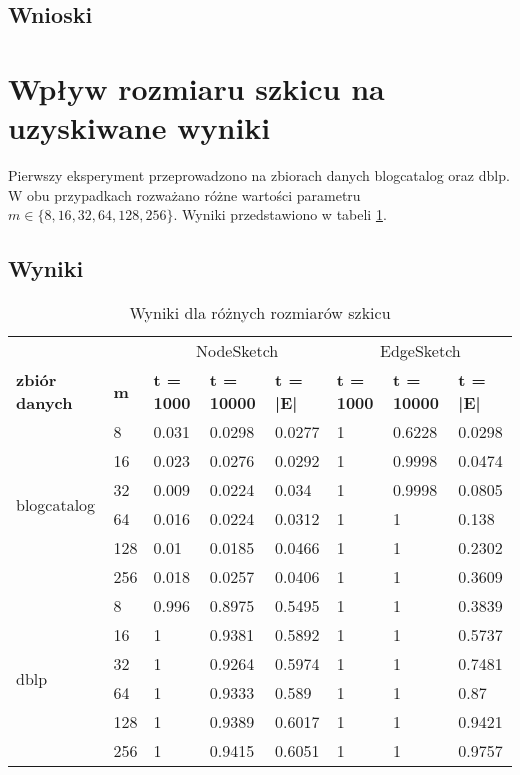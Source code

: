     \subsection{Wnioski}

\section{Wpływ rozmiaru szkicu na uzyskiwane wyniki}

    Pierwszy eksperyment przeprowadzono na zbiorach danych blogcatalog oraz dblp. W obu przypadkach rozważano różne wartości parametru $m \in \{8, 16, 32, 64, 128, 256\}$. Wyniki przedstawiono w tabeli \ref{tab:sketch_size}.

    \subsection{Wyniki}
    \begin{table}[!ht]
        \small
        \centering
        \begin{tabular}{|l|l|l|l|l|l|l|l|}
        \hline
        & & \multicolumn{3}{c|}{NodeSketch} & \multicolumn{3}{c|}{EdgeSketch} \\ \cline{1-8}
                \textbf{zbiór danych} & \textbf{m} & \textbf{t = 1000} & \textbf{t = 10000} & \textbf{t = |E|} & \textbf{t = 1000} & \textbf{t = 10000} & \textbf{t = |E|} \\ \hline\hline
        \multirow{6}{*}{blogcatalog} & 8 & 0.031 & 0.0298 & 0.0277 & 1 & 0.6228 & 0.0298 \\ \cline{2-8}
            & 16 & 0.023 & 0.0276 & 0.0292 & 1 & 0.9998 & 0.0474 \\ \cline{2-8}
            & 32 & 0.009 & 0.0224 & 0.034 & 1 & 0.9998 & 0.0805 \\ \cline{2-8}
            & 64 & 0.016 & 0.0224 & 0.0312 & 1 & 1 & 0.138 \\ \cline{2-8}
            & 128 & 0.01 & 0.0185 & 0.0466 & 1 & 1 & 0.2302 \\ \cline{2-8}
            & 256 & 0.018 & 0.0257 & 0.0406 & 1 & 1 & 0.3609 \\ \hline\hline
        \multirow{6}{*}{dblp} & 8 & 0.996 & 0.8975 & 0.5495 & 1 & 1 & 0.3839 \\ \cline{2-8}
            & 16 & 1 & 0.9381 & 0.5892 & 1 & 1 & 0.5737 \\ \cline{2-8}
            & 32 & 1 & 0.9264 & 0.5974 & 1 & 1 & 0.7481 \\ \cline{2-8}
            & 64 & 1 & 0.9333 & 0.589 & 1 & 1 & 0.87 \\ \cline{2-8}
            & 128 & 1 & 0.9389 & 0.6017 & 1 & 1 & 0.9421 \\ \cline{2-8}
            & 256 & 1 & 0.9415 & 0.6051 & 1 & 1 & 0.9757 \\ \hline
        \end{tabular}
        \label{tab:sketch_size}
        \caption{Wyniki dla różnych rozmiarów szkicu}
    \end{table}
